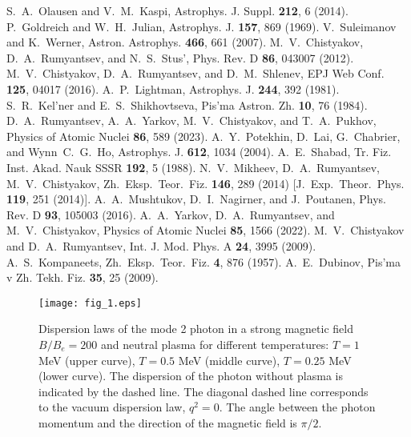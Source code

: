 \documentclass[
aps,%
12pt,%
final,%
notitlepage,%
oneside,%
onecolumn,%
nobibnotes,%
nofootinbib,%
superscriptaddress,%
noshowpacs,%
centertags]%
{revtex4}
\begin{document}
%
%
\begin{thebibliography}{99}
S.~A.~Olausen and  V.~M.~Kaspi, Astrophys. J. Suppl. \textbf{212}, 6 (2014).
%
P.~Goldreich and W.~H.~Julian, Astrophys. J. \textbf{157}, 869 (1969). 
%
V.~Suleimanov and K.~Werner, Astron. Astrophys. \textbf{466}, 661 (2007).
%
M.~V.~Chistyakov, D.~A.~Rumyantsev, and N.~S.~Stus', Phys. Rev. D  \textbf{86}, 043007 (2012).
%
M.~V.~Chistyakov, D.~A.~Rumyantsev, and D.~M.~Shlenev, EPJ Web Conf. \textbf{125}, 04017 (2016).
%
A.~P.~Lightman, Astrophys. J. \textbf{244}, 392 (1981).
S.~R.~Kel'ner  and E.~S.~Shikhovtseva, Pis'ma Astron. Zh. \textbf{10}, 76 (1984). 
%
D.~A.~Rumyantsev, A.~A.~Yarkov, M.~V.~Chistyakov, and T.~A.~Pukhov, 
 Physics of Atomic Nuclei  \textbf{86}, 589 (2023).
%
A.~Y.~Potekhin, D.~Lai, G.~Chabrier, and Wynn~C.~G.~Ho, Astrophys. J. \textbf{612}, 1034 (2004). 
%
A.~E.~Shabad, Tr. Fiz. Inst. Akad. Nauk SSSR \textbf{192}, 5 (1988).
%
   N.~V.~Mikheev, D.~A.~Rumyantsev, M.~V.~Chistyakov, 
   Zh.~Eksp.~Teor.~Fiz. \textbf{146}, 289 (2014) [J.~Exp.~Theor.~Phys. \textbf{119}, 251 (2014)].
%
A.~A.~Mushtukov, D.~I.~Nagirner, and J.~Poutanen, Phys. Rev. D  \textbf{93}, 105003 (2016).
%
A.~A.~Yarkov, D.~A.~Rumyantsev, and  M.~V.~Chistyakov, Physics of Atomic Nuclei \textbf{85}, 1566 (2022).
%
M.~V.~Chistyakov and D.~A.~Rumyantsev, Int. J. Mod. Phys. A  \textbf{24}, 3995 (2009).
%
%
A.~S.~Kompaneets, Zh.~Eksp.~Teor.~Fiz. \textbf{4}, 876 (1957).
%
A.~E.~Dubinov, Pis'ma v Zh. Tekh. Fiz.  \textbf{35}, 25 (2009). 
\end{thebibliography}
%
%
\newpage
\begin{figure}
\setcaptionmargin{5mm}
\onelinecaptionstrue
\texttt{[image: fig\_1.eps]} %
\caption{Dispersion laws of the mode 2 photon in a strong magnetic field $B/B_e = 200$
and neutral plasma for different temperatures: $T = 1$ MeV
(upper curve), $T = 0.5$ MeV (middle curve), $T = 0.25$ MeV (lower curve).
The dispersion of the photon without plasma is indicated by the dashed line. The diagonal dashed
line corresponds to the vacuum dispersion law, $q^2 = 0$.
The angle between the photon momentum and the direction of the magnetic field is $\pi/2$.}
\label{fig:disT}
\end{figure}
\end{document}
